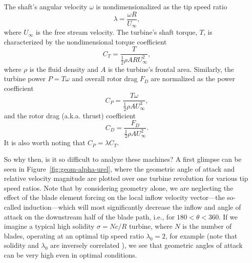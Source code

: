 The shaft's angular velocity $\omega$ is nondimensionalized as the tip speed
ratio
\begin{equation}
    \lambda = \frac{\omega R}{U_\infty},
    \label{eq:lambda}
\end{equation}
where $U_\infty$ is the free stream velocity. The turbine's shaft torque, $T$,
is characterized by the nondimensional torque coefficient
\begin{equation}
    C_T = \frac{T}{\frac{1}{2} \rho A R U_\infty^2},
    \label{eq:ct}
\end{equation}
where $\rho$ is the fluid density and $A$ is the turbine's frontal area.
Similarly, the turbine power $P = T\omega$ and overall rotor drag $F_D$ are
normalized as the power coefficient
\begin{equation}
    C_P = \frac{T \omega}{\frac{1}{2} \rho A U_\infty^3},
    \label{eq:cp}
\end{equation}
and the rotor drag (a.k.a. thrust) coefficient
\begin{equation}
    C_D = \frac{F_D}{\frac{1}{2} \rho A U_\infty^2}.
    \label{eq:cd}
\end{equation}
It is also worth noting that $C_P = \lambda C_T$.


So why then, is it so difficult to analyze these machines? A first glimpse can
be seen in Figure~\ref{fig:geom-alpha-urel}, where the geometric angle of attack
and relative velocity magnitude are plotted over one turbine revolution for
various tip speed ratios. Note that by considering geometry alone, we are
neglecting the effect of the blade element forcing on the local inflow velocity
vector---the so-called induction---which will most significantly decrease the
inflow and angle of attack on the downstream half of the blade path, i.e., for
$180 < \theta < 360$. If we imagine a typical high solidity $\sigma = Nc/R$
turbine, where $N$ is the number of blades, operating at an optimal tip speed
ratio $\lambda_0 = 2$, for example \cite{Howell2010} (note that solidity and
$\lambda_0$ are inversely correlated \cite{Templin1974}), we see that geometric
angles of attack can be very high even in optimal conditions.

